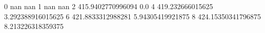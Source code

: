 0 nan nan
1 nan nan
2 415.9402770996094 0.0
4 419.232666015625 3.292388916015625
6 421.8833312988281 5.94305419921875
8 424.15350341796875 8.213226318359375
